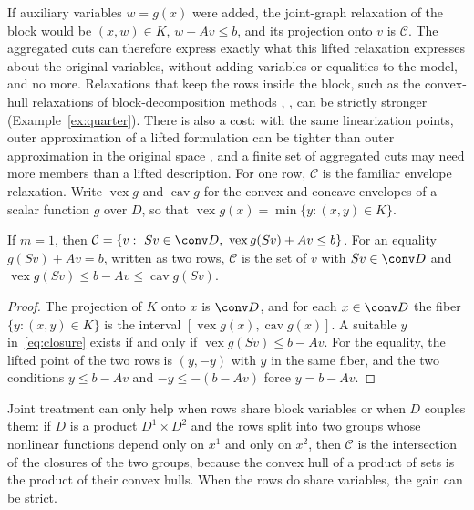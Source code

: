 If auxiliary variables $w=g(x)$ were added, the joint-graph relaxation of the
block would be $(x,w)\in K$, $w+Av\le b$, and its projection onto $v$ is
$\mathcal C$. The aggregated cuts can therefore express exactly what this lifted
relaxation expresses about the original variables, without adding variables
or equalities to the model, and no more. Relaxations that keep the rows
inside the block, such as the convex-hull relaxations of block-decomposition
methods \citep[Section~3]{Nowak2005}, \citep{WuMutsNowakHendrix2025}, can be
strictly stronger (Example~\ref{ex:quarter}). There is also a cost: with the
same linearization points, outer approximation of a lifted formulation can be
tighter than outer approximation in the original space
\citep{TawarmalaniSahinidis2005}, and a finite set of aggregated cuts may need
more members than a lifted description. For one row, $\mathcal C$ is the
familiar envelope relaxation. Write $\operatorname{vex}g$ and
$\operatorname{cav}g$ for the convex and concave envelopes of a scalar
function $g$ over $D$, so that $\operatorname{vex}g(x)=\min\{y:(x,y)\in K\}$.

\begin{corollary}\label{cor:one-row}
If $m=1$, then $\mathcal C=\{v:\ Sv\in\conv D,\ \operatorname{vex}g(Sv)+Av\le b\}$.
For an equality $g(Sv)+Av=b$, written as two rows, $\mathcal C$ is the set of
$v$ with $Sv\in\conv D$ and
$\operatorname{vex}g(Sv)\le b-Av\le\operatorname{cav}g(Sv)$.
\end{corollary}

\begin{proof}
The projection of $K$ onto $x$ is $\conv D$, and for each $x\in\conv D$ the
fiber $\{y:(x,y)\in K\}$ is the interval
$[\operatorname{vex}g(x),\operatorname{cav}g(x)]$. A suitable $y$
in~\eqref{eq:closure} exists if and only if $\operatorname{vex}g(Sv)\le b-Av$.
For the equality, the lifted point of the two rows is $(y,-y)$ with $y$ in the
same fiber, and the two conditions $y\le b-Av$ and $-y\le-(b-Av)$ force
$y=b-Av$.
\end{proof}

Joint treatment can only help when rows share block variables or when $D$
couples them: if $D$ is a product $D^1\times D^2$ and the rows split into two
groups whose nonlinear functions depend only on $x^1$ and only on $x^2$, then
$\mathcal C$ is the intersection of the closures of the two groups, because the
convex hull of a product of sets is the product of their convex hulls.
When the rows do share variables, the gain can be strict.

